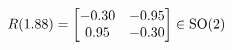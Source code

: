 \documentclass[preview]{standalone}
\begin{document}
\begin{align*}
\special{dvisvgm:raw <g id='unique000'>}R(1.88) = \begin{bmatrix} -0.30 & -0.95 \\ 0.95 & -0.30 \end{bmatrix} \in \text{SO}(2)\special{dvisvgm:raw </g>}
\end{align*}
\end{document}

